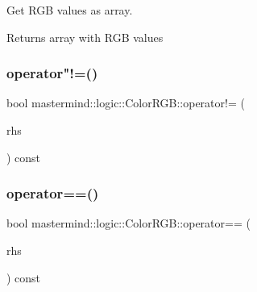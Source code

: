 Get R\+GB values as array. 

\begin{DoxyReturn}{Returns}
array with R\+GB values 
\end{DoxyReturn}
\hypertarget{classmastermind_1_1logic_1_1_color_r_g_b_ab81f315c0d1bba56d40a1766b51b0273}{}\label{classmastermind_1_1logic_1_1_color_r_g_b_ab81f315c0d1bba56d40a1766b51b0273} 
\subsubsection{\texorpdfstring{operator"!=()}{operator!=()}}
{\footnotesize\ttfamily bool mastermind\+::logic\+::\+Color\+R\+G\+B\+::operator!= (\begin{DoxyParamCaption}\item[{const \hyperlink{classmastermind_1_1logic_1_1_color_r_g_b}{Color\+R\+GB} \&}]{rhs }\end{DoxyParamCaption}) const}

\hypertarget{classmastermind_1_1logic_1_1_color_r_g_b_abe96ac5c31537e3bafaa52d1eab98a2f}{}\label{classmastermind_1_1logic_1_1_color_r_g_b_abe96ac5c31537e3bafaa52d1eab98a2f} 
\subsubsection{\texorpdfstring{operator==()}{operator==()}}
{\footnotesize\ttfamily bool mastermind\+::logic\+::\+Color\+R\+G\+B\+::operator== (\begin{DoxyParamCaption}\item[{const \hyperlink{classmastermind_1_1logic_1_1_color_r_g_b}{Color\+R\+GB} \&}]{rhs }\end{DoxyParamCaption}) const}

\hypertarget{classmastermind_1_1logic_1_1_color_r_g_b_ab80986e7ab151d26d47ad28d153a6a88}{}\label{classmastermind_1_1logic_1_1_color_r_g_b_ab80986e7ab151d26d47ad28d153a6a88} 
